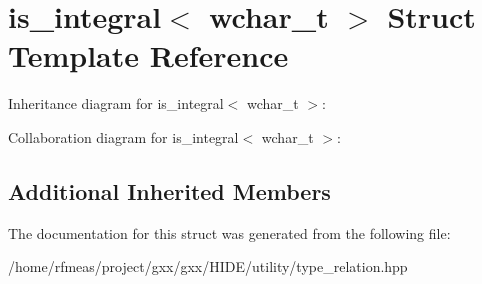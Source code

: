 \hypertarget{structis__integral_3_01wchar__t_01_4}{}\section{is\+\_\+integral$<$ wchar\+\_\+t $>$ Struct Template Reference}
\label{structis__integral_3_01wchar__t_01_4}


Inheritance diagram for is\+\_\+integral$<$ wchar\+\_\+t $>$\+:


Collaboration diagram for is\+\_\+integral$<$ wchar\+\_\+t $>$\+:
\subsection*{Additional Inherited Members}


The documentation for this struct was generated from the following file\+:\begin{DoxyCompactItemize}
\item 
/home/rfmeas/project/gxx/gxx/\+H\+I\+D\+E/utility/type\+\_\+relation.\+hpp\end{DoxyCompactItemize}
